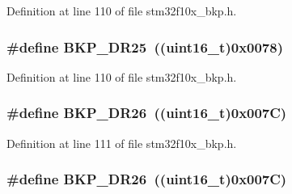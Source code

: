 Definition at line 110 of file stm32f10x\+\_\+bkp.\+h.

\subsubsection[{\texorpdfstring{B\+K\+P\+\_\+\+D\+R25}{BKP_DR25}}]{\setlength{\rightskip}{0pt plus 5cm}\#define B\+K\+P\+\_\+\+D\+R25~(({\bf uint16\+\_\+t})0x0078)}\hypertarget{group___data___backup___register_ga99c4f81f642716e6b4544284d938ee9f}{}\label{group___data___backup___register_ga99c4f81f642716e6b4544284d938ee9f}


Definition at line 110 of file stm32f10x\+\_\+bkp.\+h.

\subsubsection[{\texorpdfstring{B\+K\+P\+\_\+\+D\+R26}{BKP_DR26}}]{\setlength{\rightskip}{0pt plus 5cm}\#define B\+K\+P\+\_\+\+D\+R26~(({\bf uint16\+\_\+t})0x007\+C)}\hypertarget{group___data___backup___register_ga06b425e00596cf4c6a43e638f7542e0a}{}\label{group___data___backup___register_ga06b425e00596cf4c6a43e638f7542e0a}


Definition at line 111 of file stm32f10x\+\_\+bkp.\+h.

\subsubsection[{\texorpdfstring{B\+K\+P\+\_\+\+D\+R26}{BKP_DR26}}]{\setlength{\rightskip}{0pt plus 5cm}\#define B\+K\+P\+\_\+\+D\+R26~(({\bf uint16\+\_\+t})0x007\+C)}\hypertarget{group___data___backup___register_ga06b425e00596cf4c6a43e638f7542e0a}{}\label{group___data___backup___register_ga06b425e00596cf4c6a43e638f7542e0a}


